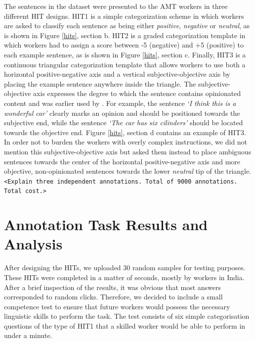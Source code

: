 \documentclass[11pt,letterpaper]{article}
\begin{document}
The sentences in the dataset were presented to the AMT workers in three different HIT designs. HIT1 is a simple categorization scheme in which workers are asked to classify each sentence as being either \textit{positive}, \textit{negative} or \textit{neutral}, as is shown in Figure \ref{hits}, section b. HIT2 is a graded categorization template in which workers had to assign a score between -5 (negative) and +5 (positive) to each example sentence, as is shown in Figure \ref{hits}, section c. Finally, HIT3 is a continuous triangular categorization template that allows workers to use both a horizontal positive-negative axis and a vertical subjective-objective axis by placing the example sentence anywhere inside the triangle. The subjective-objective axis expresses the degree to which the sentence contains opinionated content and was earlier used by \cite{sentiwordnet:06}. For example, the sentence \textit{`I think this is a wonderful car'} clearly marks an opinion and should be positioned towards the subjective end, while the sentence \textit{`The car has six cilinders'} should be located towards the objective end. Figure \ref{hits}, section d contains an example of HIT3. In order not to burden the workers with overly complex instructions, we did not mention this subjective-objective axis but asked them instead to place ambiguous sentences towards the center of the horizontal positive-negative axis and more objective, non-opinionated sentences towards the lower \textit{neutral} tip of the triangle.\\

\texttt{<Explain three independent annotations. Total of 9000 annotations. Total cost.>}

\section{Annotation Task Results and Analysis}
\label{sect:results}

After designing the HITs, we uploaded 30 random samples for testing purposes. These HITs were completed in a matter of seconds, mostly by workers in India. After a brief inspection of the results, it was obvious that most answers corresponded to random clicks. Therefore, we decided to include a small competence test to ensure that future workers would possess the necessary linguistic skills to perform the task. The test consists of six simple categorisation questions of the type of HIT1 that a skilled worker would be able to perform in under a minute.
\end{document}
